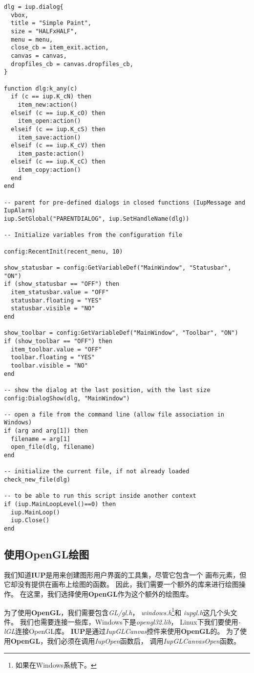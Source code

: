 \documentclass{ctexart}
\begin{document}
\begin{lstlisting}
dlg = iup.dialog{
  vbox,
  title = "Simple Paint",
  size = "HALFxHALF",
  menu = menu,
  close_cb = item_exit.action,
  canvas = canvas,
  dropfiles_cb = canvas.dropfiles_cb,
}

function dlg:k_any(c)
  if (c == iup.K_cN) then
    item_new:action()
  elseif (c == iup.K_cO) then
    item_open:action()
  elseif (c == iup.K_cS) then
    item_save:action()
  elseif (c == iup.K_cV) then
    item_paste:action()  
  elseif (c == iup.K_cC) then
    item_copy:action()  
  end
end

-- parent for pre-defined dialogs in closed functions (IupMessage and IupAlarm)
iup.SetGlobal("PARENTDIALOG", iup.SetHandleName(dlg))

-- Initialize variables from the configuration file

config:RecentInit(recent_menu, 10)
 
show_statusbar = config:GetVariableDef("MainWindow", "Statusbar", "ON")
if (show_statusbar == "OFF") then
  item_statusbar.value = "OFF"
  statusbar.floating = "YES"
  statusbar.visible = "NO"
end

show_toolbar = config:GetVariableDef("MainWindow", "Toolbar", "ON")
if (show_toolbar == "OFF") then
  item_toolbar.value = "OFF"
  toolbar.floating = "YES"
  toolbar.visible = "NO"
end

-- show the dialog at the last position, with the last size
config:DialogShow(dlg, "MainWindow")

-- open a file from the command line (allow file association in Windows)
if (arg and arg[1]) then
  filename = arg[1]
  open_file(dlg, filename)
end

-- initialize the current file, if not already loaded
check_new_file(dlg)

-- to be able to run this script inside another context
if (iup.MainLoopLevel()==0) then
  iup.MainLoop()
  iup.Close()
end
\end{lstlisting}

\subsection{使用OpenGL绘图}

我们知道\textbf{IUP}是用来创建图形用户界面的工具集，尽管它包含一个
画布元素，但它却没有提供在画布上绘图的函数。
因此，我们需要一个额外的库来进行绘图操作。
在这里，我们选择使用\textbf{OpenGL}作为这个额外的绘图库。

为了使用\textbf{OpenGL}，我们需要包含\emph{GL/gl.h}，
\emph{windows.h}\footnote{如果在Windows系统下。}和
\emph{iupgl.h}这几个头文件。
我们也需要连接一些库，Windows下是\emph{opengl32.lib}，
Linux下我们要使用\emph{-lGL}连接OpenGL库。
\textbf{IUP}是通过\emph{IupGLCanvas}控件来使用\textbf{OpenGL}的。
为了使用\textbf{OpenGL}，我们必须在调用\emph{IupOpen}函数后，
调用\emph{IupGLCanvasOpen}函数。
\end{document}
